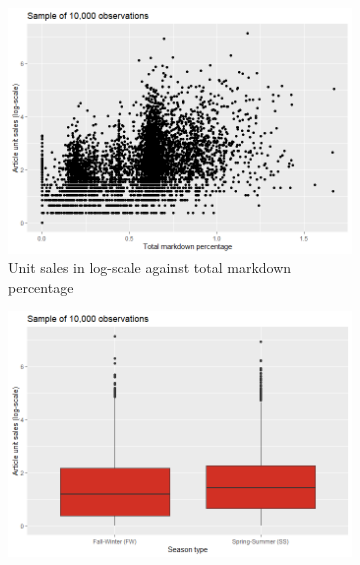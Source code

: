 %
%
%



 \begin{figure}[H]
\centering
\begin{subfigure}{.45\textwidth}
  \centering
  \includegraphics[width=\linewidth]{figures/markdown_against_logsales.png}
  \caption{Unit sales in log-scale against total markdown percentage}
  \label{fig:markdown_against_logsales}
\end{subfigure}
\begin{subfigure}{.45\textwidth}
  \centering
  \includegraphics[width=\linewidth]{figures/season_type_against_logsales.png}

\end{subfigure}
\end{figure}
